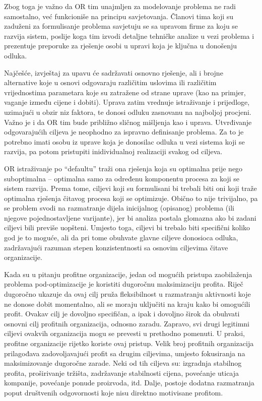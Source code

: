 \documentclass[a4paper, utf8, 11pt, colorlinks]{book}
\begin{document}
Zbog toga je važno da OR tim unajmljen za modelovanje problema ne radi samostalno, već funkcioniše na principu savjetovanja. Članovi tima koji su zaduženi za formulisanje problema savjetuju se sa upravom firme za koju se razvija sistem, poslije koga tim izvodi detaljne tehničke analize u vezi problema i prezentuje preporuke za rješenje  osobi u upravi koja je ključna u donošenju odluka.   


Najčešće, izvještaj za upavu će sadržavati osnovno rješenje, ali i brojne alternative koje u osnovi odgovaraju različitim uslovima ili različitim  vrijednostima parametara koje su zatražene od strane uprave (kao na primjer, vaganje između cijene i dobiti). Uprava zatim vrednuje istraživanje i prijedloge, uzimajući u obzir  niz faktora, te donosi odluku zasnovanu na najboljoj procjeni. Važno je i da OR tim bude približno sličnog mišljenja kao i uprava. Utvrđivanje odgovarajućih ciljeva je  neophodno za ispravno definisanje problema.  Za to je potrebno imati osobu iz uprave koja je donosilac odluka u vezi sistema koji se razvija, pa potom pristupiti inidividualnoj realizaciji svakog od ciljeva.

OR istraživanje po ``defaultu'' traži ona rješenja koja su optimalna prije nego suboptimalna -- optimalna samo za određenu komponentu procesa za koji se sistem razvija. Prema tome, ciljevi koji su formulisani bi trebali biti oni koji traže optimalna rješenja čitavog procesa koji se optimizuje.  Obično to nije trivijalno, pa se problem svodi na razmatranje dijela inicijalnog (opisanog) problema (ili njegove pojednostavljene varijante), jer bi analiza postala glomazna ako bi zadani ciljevi bili previše uopšteni. Umjesto toga, ciljevi bi trebalo biti specifični 
koliko god je to moguće, ali da pri tome obuhvate glavne ciljeve donosioca odluka, zadržavajući razuman stepen konzistentnosti sa osnovim ciljevima čitave organizacije. 

Kada su u pitanju profitne organizacije, jedan od mogućih pristupa zaobilaženja problema pod-optimizacije je koristiti dugoročnu maksimizaciju profita. Riječ dugoročno ukazuje da ovaj cilj pruža fleksibilnost u razmatranju aktivnosti koje ne donose dobit momentalno, ali se moraju uključiti na kraju kako bi omogućili profit. Ovakav cilj je   dovoljno specifičan, a ipak i dovoljno širok da obuhvati osnovni cilj profitnih organizacija, odnosno zaradu. Zapravo, svi drugi legitimni ciljevi ovakvih organizacija mogu se prevesti u prethodno pomenuti. U praksi, profitne organizacije rijetko koriste ovaj pristup. Velik broj profitnih organizacija prilagođava zadovoljavajući profit sa drugim ciljevima, umjesto fokusiranja na maksimizovanje dugoročne zarade. Neki od tih ciljeva su: izgradnja stabilnog profita, proširivanje tržišta, zadržavanje stabilnosti cijena, povećanje uticaja kompanije, povećanje ponude proizvoda, itd. 
Dalje, postoje dodatna razmatranja poput društvenih odgovornosti koje nisu direktno motivisane profitom.  
\end{document}
